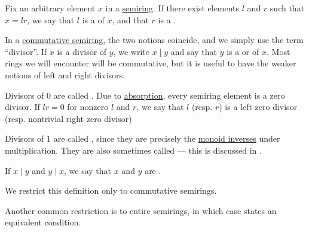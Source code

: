 \begin{definition}\label{def:divisibility}\mimprovised
  Fix an arbitrary element \( x \) in a \hyperref[def:semiring]{semiring}. If there exist elements \( l \) and \( r \) such that \( x = lr \), we say that \( l \) is a  of \( x \), and that \( r \) is a .

  In a \hyperref[def:semiring/commutative]{commutative semiring}, the two notions coincide, and we simply use the term \enquote{divisor}. If \( x \) is a divisor of \( y \), we write \( x \mid y \) and say that \( y \) is a  or  of \( x \). Most rings we will encounter will be commutative, but it is useful to have the weaker notions of left and right divisors.

  \begin{thmenum}
     Divisors of \( 0 \) are called . Due to \hyperref[def:semiring/absorption]{absorption}, every semiring element is a zero divisor. If \( lr = 0 \) for nonzero \( l \) and \( r \), we say that \( l \) (resp. \( r \)) is a  left zero divisor (resp. nontrivial right zero divisor)

     Divisors of \( 1 \) are called , since they are precisely the \hyperref[def:monoid_inverse]{monoid inverses} under multiplication. They are also sometimes called  --- this is discussed in .

     If \( x \mid y \) and \( y \mid x \), we say that \( x \) and \( y \) are .

    We restrict this definition only to commutative semirings.

    Another common restriction is to entire semirings, in which case  states an equivalent condition.
  \end{thmenum}
\end{definition}

